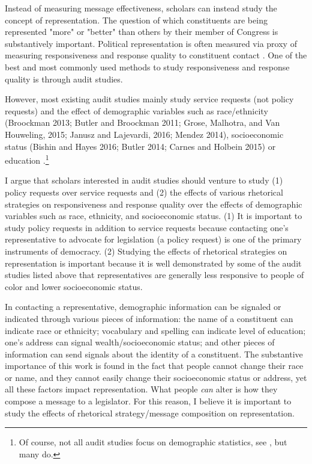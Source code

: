\documentclass[12pt]{article}
\begin{document}
Instead of measuring message effectiveness, scholars can instead study the concept of representation. The question of which constituents are being represented "more" or "better" than others by their member of Congress is substantively important. Political representation is often measured via proxy of measuring responsiveness and response quality to constituent contact \citep{Butler:2011ac, dahl1956preface,Verba:2003aa}. One of the best and most commonly used methods to study responsiveness and response quality is through audit studies.

However, most existing audit studies mainly study service requests (not policy requests) and the effect of demographic variables such as race/ethnicity (Broockman 2013; Butler and Broockman 2011; Grose, Malhotra, and Van Houweling, 2015; Janusz and Lajevardi, 2016; Mendez 2014), socioeconomic status (Bishin and Hayes 2016; Butler 2014; Carnes and Holbein 2015) or education \cite{Neiman2017}.\footnote{Of course, not all audit studies focus on demographic statistics, see \cite{Grose:2015aa,Costa:2017aa}, but many do.} 

I argue that scholars interested in audit studies should venture to study (1) policy requests over service requests and (2) the effects of various rhetorical strategies on responsiveness and response quality over the effects of demographic variables such as race, ethnicity, and socioeconomic status. (1) It is important to study policy requests in addition to service requests because contacting one's representative to advocate for legislation (a policy request) is one of the primary instruments of democracy. (2) Studying the effects of rhetorical strategies on representation is important because it is well demonstrated by some of the audit studies listed above that representatives are generally less responsive to people of color and lower socioeconomic status.

 In contacting a representative, demographic information can be signaled or indicated through various pieces of information: the name of a constituent can indicate race or ethnicity; vocabulary and spelling can indicate level of education; one's address can signal wealth/socioeconomic status; and other pieces of information can send signals about the identity of a constituent. The substantive importance of this work is found in the fact that people cannot change their race or name, and they cannot easily change their socioeconomic status or address, yet all these factors impact representation. What people \textit{can} alter is how they compose a message to a legislator. For this reason, I believe it is important to study the effects of rhetorical strategy/message composition on representation.
 
\end{document}
